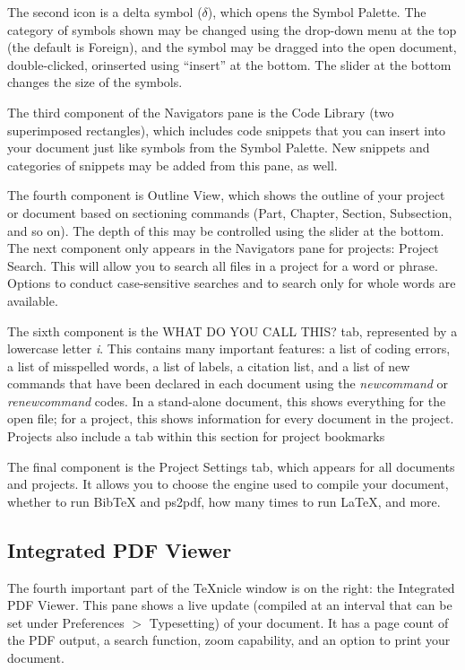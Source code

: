 \documentclass[11pt]{report}
\begin{document}
The second icon is a delta symbol ($\delta$), which opens the Symbol Palette. The category of symbols shown may be changed using the drop-down menu at the top (the default is Foreign), and the symbol may be dragged into the open document, double-clicked, orinserted using ``insert'' at the bottom. The slider at the bottom changes the size of the symbols.

The third component of the Navigators pane is the Code Library (two superimposed rectangles), which includes code snippets that you can insert into your document just like symbols from the Symbol Palette. New snippets and categories of snippets may be added from this pane, as well.

The fourth component is Outline View, which shows the outline of your project or document based on sectioning commands (Part, Chapter, Section, Subsection, and so on). The depth of this may be controlled using the slider at the bottom. The next component only appears in the Navigators pane for projects: Project Search. This will allow you to search all files in a project for a word or phrase. Options to conduct case-sensitive searches and to search only for whole words are available.

The sixth component is the WHAT DO YOU CALL THIS? tab, represented by a lowercase letter \textsl{i}. This contains many important features: a list of coding errors, a list of misspelled words, a list of labels, a citation list, and a list of new commands that have been declared in each document using the \textsl{newcommand} or \textsl{renewcommand} codes. In a stand-alone document, this shows everything for the open file; for a project, this shows information for every document in the project. Projects also include a tab within this section for project bookmarks

The final component is the Project Settings tab, which appears for all documents and projects. It allows you to choose the engine used to compile your document, whether to run BibTeX and ps2pdf, how many times to run LaTeX, and more.

\subsection{Integrated PDF Viewer}

The fourth important part of the TeXnicle window is on the right: the Integrated PDF Viewer. This pane shows a live update (compiled at an interval that can be set under Preferences $>$ Typesetting) of your document. It has a page count of the PDF output, a search function, zoom capability, and an option to print your document.
\end{document}
